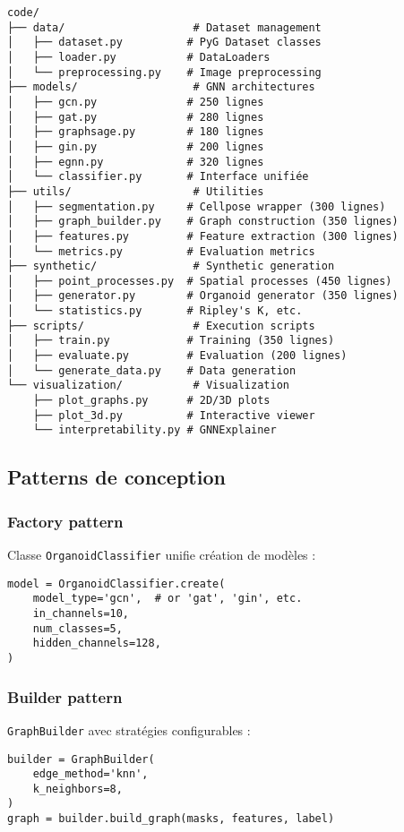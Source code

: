 \begin{verbatim}
code/
├── data/                    # Dataset management
│   ├── dataset.py          # PyG Dataset classes
│   ├── loader.py           # DataLoaders
│   └── preprocessing.py    # Image preprocessing
├── models/                  # GNN architectures
│   ├── gcn.py              # 250 lignes
│   ├── gat.py              # 280 lignes
│   ├── graphsage.py        # 180 lignes
│   ├── gin.py              # 200 lignes
│   ├── egnn.py             # 320 lignes
│   └── classifier.py       # Interface unifiée
├── utils/                   # Utilities
│   ├── segmentation.py     # Cellpose wrapper (300 lignes)
│   ├── graph_builder.py    # Graph construction (350 lignes)
│   ├── features.py         # Feature extraction (300 lignes)
│   └── metrics.py          # Evaluation metrics
├── synthetic/               # Synthetic generation
│   ├── point_processes.py  # Spatial processes (450 lignes)
│   ├── generator.py        # Organoid generator (350 lignes)
│   └── statistics.py       # Ripley's K, etc.
├── scripts/                 # Execution scripts
│   ├── train.py            # Training (350 lignes)
│   ├── evaluate.py         # Evaluation (200 lignes)
│   └── generate_data.py    # Data generation
└── visualization/           # Visualization
    ├── plot_graphs.py      # 2D/3D plots
    ├── plot_3d.py          # Interactive viewer
    └── interpretability.py # GNNExplainer
\end{verbatim}

\subsection{Patterns de conception}

\subsubsection{Factory pattern}

Classe \texttt{OrganoidClassifier} unifie création de modèles :
\begin{verbatim}
model = OrganoidClassifier.create(
    model_type='gcn',  # or 'gat', 'gin', etc.
    in_channels=10,
    num_classes=5,
    hidden_channels=128,
)
\end{verbatim}

\subsubsection{Builder pattern}

\texttt{GraphBuilder} avec stratégies configurables :
\begin{verbatim}
builder = GraphBuilder(
    edge_method='knn',
    k_neighbors=8,
)
graph = builder.build_graph(masks, features, label)
\end{verbatim}

